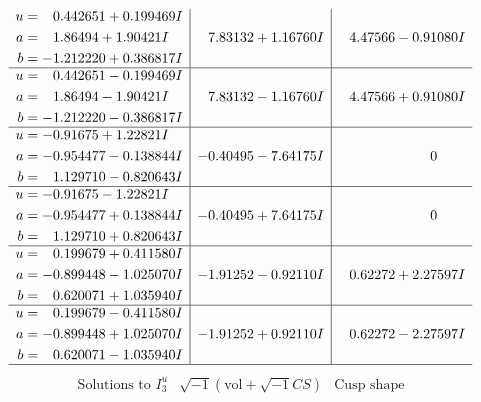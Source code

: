 \documentclass[1p]{elsarticle_modified}
\theoremstyle{definition}
\newcommand{\I}{\sqrt{-1}}
\begin{document}
$$\begin{array}{c|c|c}
\begin{aligned}
u &= \phantom{-}0.442651 + 0.199469 I \\
a &= \phantom{-}1.86494 + 1.90421 I \\
b &= -1.212220 + 0.386817 I\end{aligned}
 & \phantom{-}7.83132 + 1.16760 I & \phantom{-}4.47566 - 0.91080 I \\ \hline\begin{aligned}
u &= \phantom{-}0.442651 - 0.199469 I \\
a &= \phantom{-}1.86494 - 1.90421 I \\
b &= -1.212220 - 0.386817 I\end{aligned}
 & \phantom{-}7.83132 - 1.16760 I & \phantom{-}4.47566 + 0.91080 I \\ \hline\begin{aligned}
u &= -0.91675 + 1.22821 I \\
a &= -0.954477 - 0.138844 I \\
b &= \phantom{-}1.129710 - 0.820643 I\end{aligned}
 & -0.40495 - 7.64175 I & \phantom{-0.000000 } 0 \\ \hline\begin{aligned}
u &= -0.91675 - 1.22821 I \\
a &= -0.954477 + 0.138844 I \\
b &= \phantom{-}1.129710 + 0.820643 I\end{aligned}
 & -0.40495 + 7.64175 I & \phantom{-0.000000 } 0 \\ \hline\begin{aligned}
u &= \phantom{-}0.199679 + 0.411580 I \\
a &= -0.899448 - 1.025070 I \\
b &= \phantom{-}0.620071 + 1.035940 I\end{aligned}
 & -1.91252 - 0.92110 I & \phantom{-}0.62272 + 2.27597 I \\ \hline\begin{aligned}
u &= \phantom{-}0.199679 - 0.411580 I \\
a &= -0.899448 + 1.025070 I \\
b &= \phantom{-}0.620071 - 1.035940 I\end{aligned}
 & -1.91252 + 0.92110 I & \phantom{-}0.62272 - 2.27597 I\\
 \hline 
 \end{array}$$\newpage$$\begin{array}{c|c|c}  
\text{Solutions to }I^u_{3}& \I (\text{vol} + \sqrt{-1}CS) & \text{Cusp shape}\\

\end{array}$$
\end{document}
